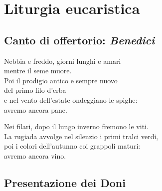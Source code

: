 
\section*{Liturgia eucaristica}

\subsection*{Canto di offertorio: \textit{Benedici}}

		\begin{mystrofe}
			Nebbia e freddo, giorni lunghi e amari \\
			mentre il seme muore. \\
			Poi il prodigio antico e sempre nuovo \\
			del primo filo d'erba \\
			e nel vento dell'estate ondeggiano le spighe: \\
			avremo ancora pane.
		\end{mystrofe}
		
		\begin{mystrofe}
		\end{mystrofe}

		\begin{mystrofe}
			Nei filari, dopo il lungo inverno fremono le viti. \\
			La rugiada avvolge nel silenzio i primi tralci verdi, \\
			poi i colori dell'autunno coi grappoli maturi: \\
			avremo ancora vino.
		\end{mystrofe}

		\begin{mystrofe}
			\ritornello{}
		\end{mystrofe}

\subsection*{Presentazione dei Doni}

